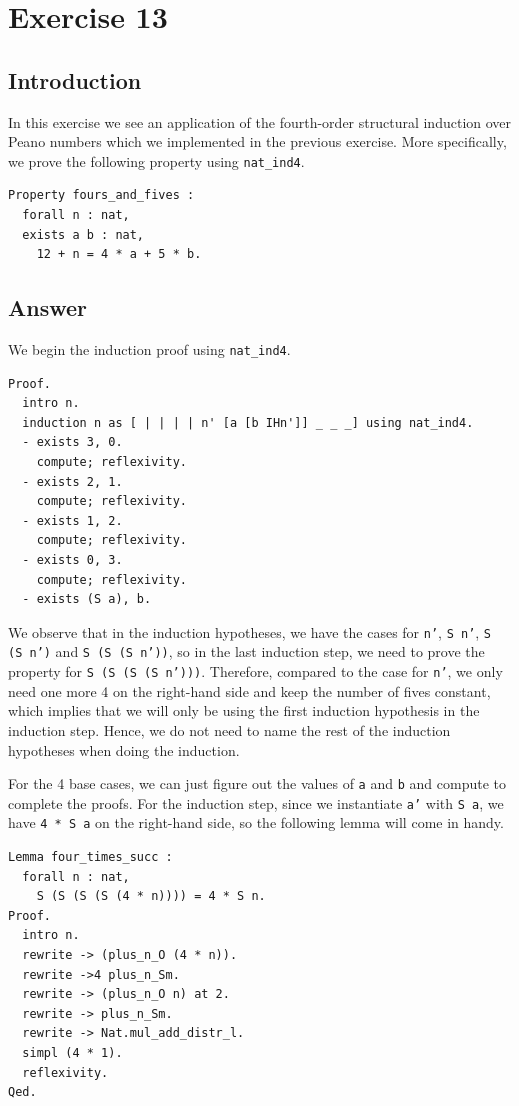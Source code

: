 \documentclass{article}
\begin{document}
\section{Exercise 13}
\subsection{Introduction}
In this exercise we see an application of the fourth-order structural induction over Peano numbers which we implemented in the previous exercise. More specifically, we prove the following property using \texttt{nat\_ind4}.
\begin{lstlisting}
Property fours_and_fives :
  forall n : nat,
  exists a b : nat,
    12 + n = 4 * a + 5 * b.
\end{lstlisting}

\subsection{Answer}
We begin the induction proof using \texttt{nat\_ind4}.

\begin{lstlisting}
Proof.
  intro n.
  induction n as [ | | | | n' [a [b IHn']] _ _ _] using nat_ind4.
  - exists 3, 0.
    compute; reflexivity.
  - exists 2, 1.
    compute; reflexivity.
  - exists 1, 2.
    compute; reflexivity.
  - exists 0, 3.
    compute; reflexivity.
  - exists (S a), b.
\end{lstlisting}

We observe that in the induction hypotheses, we have the cases for \texttt{n'}, \texttt{S n'}, \texttt{S (S n')} and \texttt{S (S (S n'))}, so in the last induction step, we need to prove the property for \texttt{S (S (S (S n')))}. Therefore, compared to the case for \texttt{n'}, we only need one more 4 on the right-hand side and keep the number of fives constant, which implies that we will only be using the first induction hypothesis in the induction step. Hence, we do not need to name the rest of the induction hypotheses when doing the induction.

For the 4 base cases, we can just figure out the values of \texttt{a} and \texttt{b} and compute to complete the proofs. For the induction step, since we instantiate \texttt{a'} with \texttt{S a}, we have \texttt{4 * S a} on the right-hand side, so the following lemma will come in handy.

\begin{lstlisting}
Lemma four_times_succ :
  forall n : nat,
    S (S (S (S (4 * n)))) = 4 * S n.
Proof.
  intro n.
  rewrite -> (plus_n_O (4 * n)).
  rewrite ->4 plus_n_Sm.
  rewrite -> (plus_n_O n) at 2.
  rewrite -> plus_n_Sm.
  rewrite -> Nat.mul_add_distr_l.
  simpl (4 * 1).
  reflexivity.
Qed.
\end{lstlisting}
\end{document}
